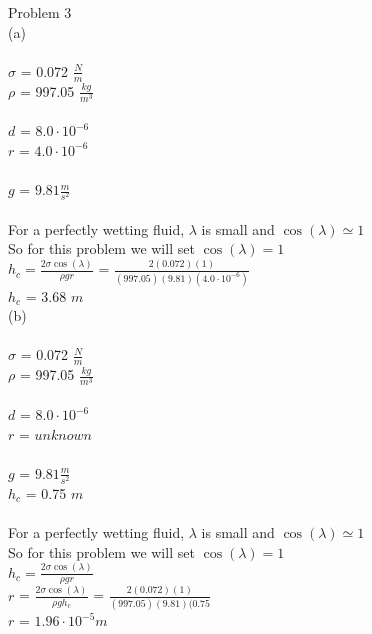 \documentclass[a4paper,12pt]{article}
\begin{document}
\fontsize{16}{20}\selectfont
\noindent
Problem 3\\
\fontsize{12}{12}\selectfont
(a)\\~\\
$\sigma$ = 0.072 $\frac{N}{m}$\\
$\rho$ = 997.05 $\frac{kg}{m^3}$\\~\\
$d$ = $8.0\cdot10^{-6}$\\
$r$ = $4.0\cdot10^{-6}$\\~\\
$g$ = $9.81 \frac{m}{s^2}$\\~\\
For a perfectly wetting fluid, $\lambda$ is small and $\cos(\lambda)\simeq1$\\
So for this problem we will set $\cos(\lambda) = 1$\\[3\baselineskip]
\fontsize{14}{16}\selectfont
$h_{c} = \frac{2\sigma\cos(\lambda)}{\rho g r}$ = $\frac{2(0.072)(1)}{(997.05)(9.81)(4.0\cdot10^{-6})}$\\
$h_{c}$ = 3.68 $m$\\[3\baselineskip]
\fontsize{12}{12}\selectfont
(b)\\~\\
$\sigma$ = 0.072 $\frac{N}{m}$\\
$\rho$ = 997.05 $\frac{kg}{m^3}$\\~\\
$d$ = $8.0\cdot10^{-6}$\\
$r$ = $unknown$\\~\\
$g$ = $9.81 \frac{m}{s^2}$\\
$h_{c}$ = 0.75 $m$\\~\\
For a perfectly wetting fluid, $\lambda$ is small and $\cos(\lambda)\simeq1$\\
So for this problem we will set $\cos(\lambda) = 1$\\[3\baselineskip]
\fontsize{14}{16}
$h_{c} = \frac{2\sigma\cos(\lambda)}{\rho g r}$\\
$r$ = $\frac{2\sigma\cos(\lambda)}{\rho g h_{c}}$ = $\frac{2(0.072)(1)}{(997.05)(9.81)(0.75}$\\
$r$ = $1.96\cdot10^{-5} m$
\end{document}
